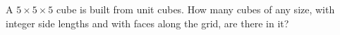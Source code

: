 A $5\times5\times5$ cube is built from unit cubes. How many cubes of any size, with integer side lengths and with faces along the grid, are there in it?

